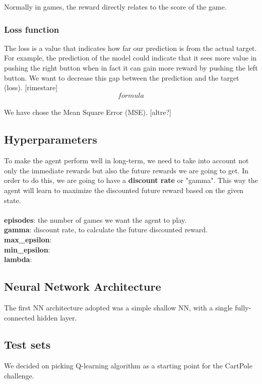 Normally in games, the reward directly relates to the score of the game.


\subsubsection{Loss function}

The loss is a value that indicates how far our prediction is from the actual target. For example, the prediction of the model could indicate that it sees more value in pushing the right button when in fact it can gain more reward by pushing the left button. We want to decrease this gap between the prediction and the target (loss).
[rimestare]
\\
\[formula\]
\\We have chose the Mean Square Error (MSE).
[altre?]

\subsection{Hyperparameters}

To make the agent perform well in long-term, we need to take into account not only the immediate rewards but also the future rewards we are going to get. In order to do this, we are going to have a \textbf{discount rate} or "gamma". This way the agent will learn to maximize the discounted future reward based on the given state.
\\\\\textbf{episodes}: the number of games we want the agent to play.
\\\textbf{gamma}: discount rate, to calculate the future discounted reward.
\\\textbf{max\_epsilon}:
\\\textbf{min\_epsilon}:
\\\textbf{lambda}:


\subsection{Neural Network Architecture}

The first NN architecture adopted was a simple shallow NN, with a single fully-connected hidden layer.

\subsection{Test sets}

We decided on picking Q-learning algorithm as a starting point for the CartPole challenge.


